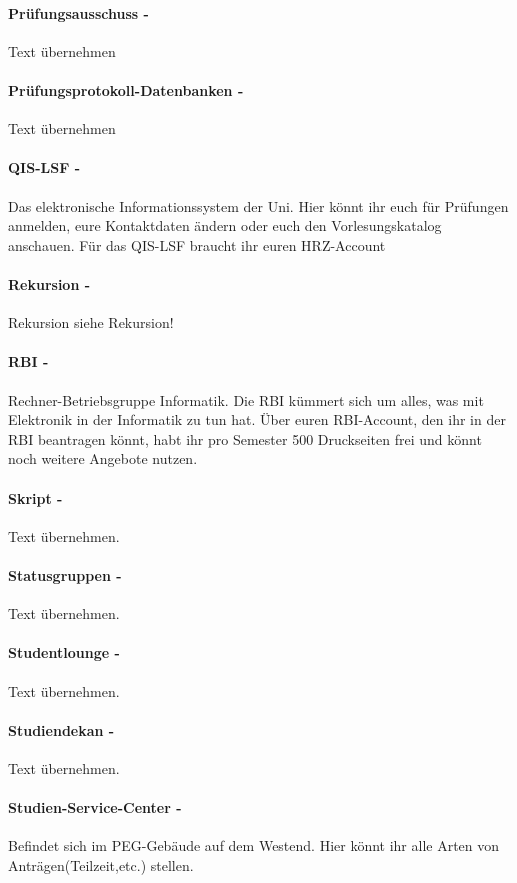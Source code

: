 \documentclass[12pt,a4paper]{article}
\begin{document}
	\paragraph{Prüfungsausschuss -} Text übernehmen
	\paragraph{Prüfungsprotokoll-Datenbanken -} Text übernehmen
	\paragraph{QIS-LSF -} Das elektronische Informationssystem der Uni. Hier könnt ihr euch für Prüfungen anmelden, eure Kontaktdaten ändern oder euch den Vorlesungskatalog anschauen. Für das QIS-LSF braucht ihr euren HRZ-Account
	\paragraph{Rekursion -} Rekursion siehe Rekursion!
	\paragraph{RBI -} \glqq Rechner-Betriebsgruppe Informatik\grqq . Die RBI kümmert sich um alles, was mit Elektronik in der Informatik zu tun hat. Über euren RBI-Account, den ihr in der RBI beantragen könnt, habt ihr pro Semester 500 Druckseiten frei und könnt noch weitere Angebote nutzen.
	\paragraph{Skript -} Text übernehmen.
	\paragraph{Statusgruppen -} Text übernehmen.
	\paragraph{Studentlounge -} Text übernehmen.
	\paragraph{Studiendekan -} Text übernehmen.
	\paragraph{Studien-Service-Center -} Befindet sich im PEG-Gebäude auf dem Westend. Hier könnt ihr alle Arten von Anträgen(Teilzeit,etc.) stellen.
\end{document}
